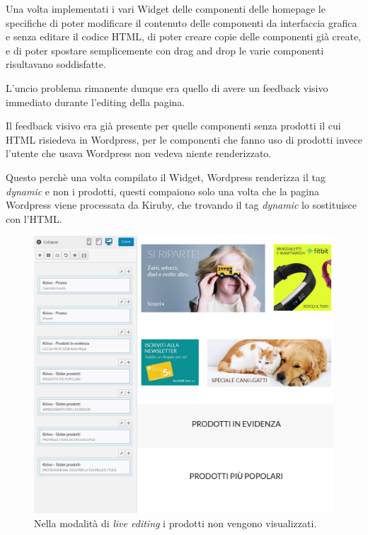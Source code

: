 


Una volta implementati i vari Widget delle componenti delle homepage le specifiche di poter
modificare il contenuto delle componenti da interfaccia grafica e senza editare
il codice HTML, di poter creare copie delle componenti già create, e di poter spostare
semplicemente con drag and drop le varie componenti risultavano soddisfatte.

L'uncio problema rimanente dunque era quello di avere un feedback visivo immediato durante l'editing della pagina.

Il feedback visivo era già presente per quelle componenti senza prodotti il cui HTML risiedeva in Wordpress,
per le componenti che fanno uso di prodotti invece l'utente che usava Wordpress non vedeva niente renderizzato.

Questo perchè una volta compilato il Widget, Wordpress renderizza il tag \emph{dynamic} e non i prodotti,
questi compaiono solo una volta che la pagina Wordpress viene processata da Kiruby, che trovando il tag \emph{dynamic}
lo sostituisce con l'HTML.

\begin{figure}
  \includegraphics[width=\textwidth]{figure/noapi.png}
  \caption{Nella modalità di \emph{live editing} i prodotti non vengono visualizzati.}
  \label{fig:kspec}
\end{figure}

